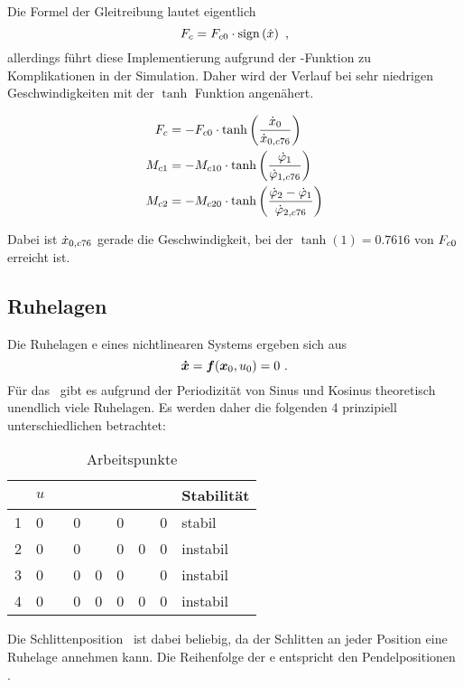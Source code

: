 Die Formel der Gleitreibung lautet eigentlich 
	\[
	F_c = F_{c0}  \cdot  \mathrm{sign}\left(\dot{x}\right) \ ,
\]
allerdings führt diese Implementierung aufgrund der -Funktion zu Komplikationen in der Simulation. 
Daher wird der Verlauf bei sehr niedrigen Geschwindigkeiten mit der $\tanh$ Funktion angenähert.

\begin{align}
	F_c  &= -F_{c0}  \cdot \tanh{\left(\frac{\ensuremath{\dot{x}_0}}{\ensuremath{\dot{x}_{0,c76}}}\right)}  \\
	M_{c1} &= -M_{c10} \cdot \tanh{\left(\frac{\ensuremath{\dot{\varphi}_1}}{\ensuremath{\dot{\varphi}_{1,c76}}}\right)}  \\
	M_{c2} &= -M_{c20} \cdot \tanh{\left(\frac{\ensuremath{\dot{\varphi}_2}-\ensuremath{\dot{\varphi}_1}}{\ensuremath{\dot{\varphi}_{2,c76}}}\right)}
\end{align}

Dabei ist $\dot{x}_{0,c76}$ gerade die Geschwindigkeit, bei der $\tanh(1)=0.7616$ von $F_{c0}$ erreicht ist.





\subsection{Ruhelagen}

Die Ruhelagen \bzw \ap e eines nichtlinearen Systems ergeben sich aus
	\[
	\boldsymbol{\dot{x}} = \boldsymbol{f}(\boldsymbol{x}_0,u_0) = 0  \ .
\]
Für das \spds\ gibt es aufgrund der Periodizität von Sinus und Kosinus theoretisch unendlich viele Ruhelagen. Es werden daher die folgenden 4 prinzipiell unterschiedlichen betrachtet:
\begin{table}[h]
	\centering
		\begin{tabular}{lllllllll}
		\toprule
			\ap  & $u$ & \xo & \xop & \phe & \phep & \phz & \phzp & Stabilität  \\
			\midrule
			1	&	0 &	\xoo	&	0	&	\pii	&	0	&	\pii	&	0	& stabil  \\
			2	&	0 &	\xoo	&	0	&	\pii	&	0	&	0			&	0	& instabil  \\
			3	&	0 &	\xoo	&	0	&	0			&	0	&	\pii	&	0	& instabil  \\
			4	&	0 &	\xoo	&	0	&	0			&	0	&	0			&	0	& instabil  \\
			\bottomrule
		\end{tabular}
	\caption{Arbeitspunkte}
	\label{tab:aps}
\end{table}

Die Schlittenposition \xo\ ist dabei beliebig, da der Schlitten an jeder Position eine Ruhelage annehmen kann.
Die Reihenfolge der \ap e entspricht den Pendelpositionen .


